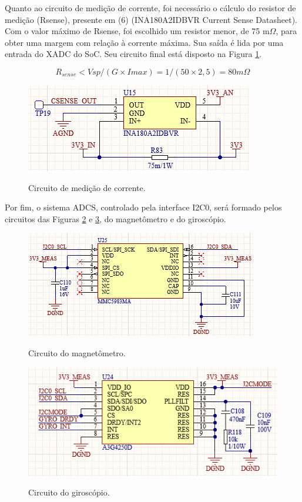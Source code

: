 Quanto ao circuito de medição de corrente, foi necessário o cálculo do resistor de medição (Rsense), presente em (6) (INA180A2IDBVR Current Sense Datasheet). Com o valor máximo de Rsense, foi escolhido um resistor menor, de 75 m$\Omega$, para obter uma margem com relação à corrente máxima. Sua saída é lida por uma entrada do XADC do SoC. Seu circuito final está disposto na Figura \ref{fig:csense}.

\begin{equation}
	R_{sense} < Vsp / (G \times Imax) = 1 / (50 \times 2,5) = 80 m\Omega
\end{equation} 

\begin{figure}[H]
    \centering
    \caption{Circuito de medição de corrente.}
    \includegraphics[scale=0.7]{images/current sense.png}
    \label{fig:csense}
\end{figure}

Por fim, o sistema ADCS, controlado pela interface I2C0, será formado pelos circuitos das Figuras \ref{fig:mag} e \ref{fig:gyro}, do magnetômetro e do giroscópio. 

\begin{figure}[H]
    \centering
    \caption{Circuito do magnetômetro.}
    \includegraphics[scale=0.7]{images/magnetometer.png}
    \label{fig:mag}
\end{figure}

\begin{figure}[H]
    \centering
    \caption{Circuito do giroscópio.}
    \includegraphics[scale=0.7]{images/gyro.png}
    \label{fig:gyro}
\end{figure}

